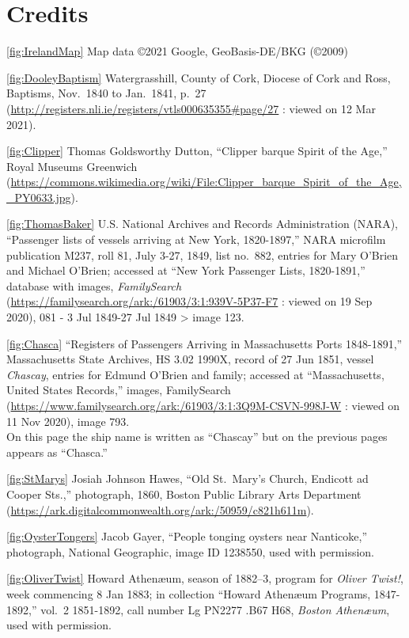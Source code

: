 
\chapter{Credits}
\raggedright
\nonzeroparskip
\footnotesize

\ref{fig:IrelandMap} Map data \copyright 2021 Google, GeoBasis-DE/BKG (\copyright 2009)

\ref{fig:DooleyBaptism} Watergrasshill, County of Cork, Diocese of Cork and Ross, Baptisms, Nov.\ 1840 to Jan.\ 1841, p.\ 27 (\url{http://registers.nli.ie/registers/vtls000635355\#page/27} : viewed on 12 Mar 2021).

\ref{fig:Clipper} Thomas Goldsworthy Dutton, ``Clipper barque Spirit of the Age,'' Royal Museums Greenwich (\url{https://commons.wikimedia.org/wiki/File:Clipper_barque_Spirit_of_the_Age,_PY0633.jpg}).

\ref{fig:ThomasBaker} U.S. National Archives and Records Administration (NARA), ``Passenger lists of vessels arriving at New York, 1820-1897,'' NARA microfilm publication M237, roll 81, July 3-27, 1849, list no.\ 882, entries for Mary O'Brien and Michael O'Brien; accessed at ``New York Passenger Lists, 1820-1891,'' database with images, \textit{FamilySearch} (\url{https://familysearch.org/ark:/61903/3:1:939V-5P37-F7} : viewed on 19 Sep 2020), 081 - 3 Jul 1849-27 Jul 1849 > image 123.

\ref{fig:Chasca} ``Registers of Passengers Arriving in Massachusetts Ports 1848-1891,'' Massachusetts State Archives, HS 3.02 1990X, record of 27 Jun 1851, vessel \textit{Chascay}, entries for Edmund O'Brien and family; accessed at ``Massachusetts, United States Records,'' images, FamilySearch (\url{https://www.familysearch.org/ark:/61903/3:1:3Q9M-CSVN-998J-W} : viewed on 11 Nov 2020), image 793.\\
On this page the ship name is written as ``Chascay'' but on the previous pages appears as ``Chasca.''

\ref{fig:StMarys} Josiah Johnson Hawes, ``Old St.\ Mary's Church, Endicott ad Cooper Sts.,'' photograph, 1860, Boston Public Library Arts Department (\url{https://ark.digitalcommonwealth.org/ark:/50959/c821h611m}).

\ref{fig:OysterTongers} Jacob Gayer, ``People tonging oysters near Nanticoke,'' photograph, National Geographic, image ID 1238550, used with permission.

\ref{fig:OliverTwist}
Howard Athen\ae um, season of 1882--3, program for \textit{Oliver Twist!}, week commencing 8 Jan 1883; in collection ``Howard Athen\ae um Programs, 1847-1892,'' vol.\ 2 1851-1892, call number Lg PN2277 .B67 H68, \textit{Boston Athen\ae um}, used with permission.


